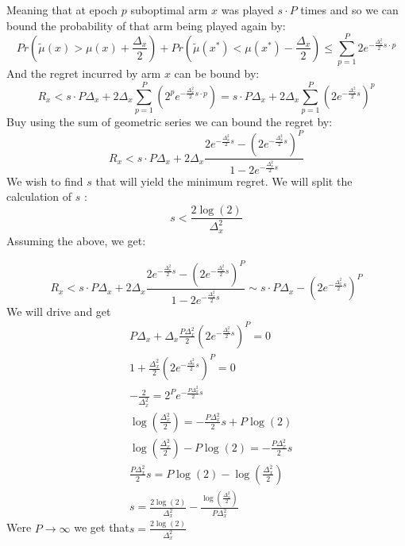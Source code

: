 \documentclass{llncs}
\begin{document}
	Meaning that at epoch $p$ suboptimal arm $x$ was played $s\cdot P$ times and so we can bound the probability of that arm being played again by:
	\begin{equation}
	Pr(\tilde{\mu}(x) > \mu(x) + \frac{\Delta_x}{2})+ 
	Pr(\tilde{\mu}(x^*)< \mu(x^*) - \frac{\Delta_x}{2}) \leq \sum\limits_{p=1}^P 2 e^{-\frac{\Delta^2_x}{2}s\cdot p}
	\end{equation}
	And the regret incurred by arm $x$ can be bound by:
	\begin{equation}
	R_x < s\cdot P\Delta_x+2\Delta_x\sum\limits_{p=1}^P \left( 2^p e^{-\frac{\Delta^2_x}{2}s\cdot p} \right) = s\cdot P\Delta_x+2\Delta_x\sum\limits_{p=1}^P \left( 2 e^{-\frac{\Delta^2_x}{2}s} \right)^p
	\end{equation}
	Buy using the sum of geometric series we can bound the regret by:
	\begin{equation}
	R_x < s\cdot P\Delta_x+2\Delta_x \frac{2 e^{-\frac{\Delta^2_x}{2}s} - (2 e^{-\frac{\Delta^2_x}{2}s})^P}{1-2 e^{-\frac{\Delta^2_x}{2}s}}
	\end{equation}
	We wish to find $s$ that will yield the minimum regret.
	We will split the calculation of $s$ :	
	$$s < \frac{2\log(2)}{\Delta^2_x}$$
	Assuming the above, we get:
	
	\begin{equation}
		R_x < s\cdot P\Delta_x+2\Delta_x \frac{2 e^{-\frac{\Delta^2_x}{2}s} - (2 e^{-\frac{\Delta^2_x}{2}s})^P}{1-2 e^{-\frac{\Delta^2_x}{2}s}} \sim s\cdot P\Delta_x - (2 e^{-\frac{\Delta^2_x}{2}s})^P
	\end{equation}	
	We will drive and get
	\begin{align*}
	& P\Delta_x + \Delta_x\frac{P\Delta^2_x}{2}(2 e^{-\frac{\Delta^2_x}{2}s})^P = 0
	\\
	& 1 +\frac{\Delta^2_x}{2}(2 e^{-\frac{\Delta^2_x}{2}s})^P = 0
	\\
	& -\frac{2}{\Delta^2_x} = 2^P e^{-\frac{P\Delta^2_x}{2}s}
	\\
	& \log(\frac{\Delta^2_x}{2}) = -\frac{P\Delta^2_x}{2}s + P\log(2)
	\\
	& \log(\frac{\Delta^2_x}{2}) - P\log(2) = -\frac{P\Delta^2_x}{2}s
	\\
	& \frac{P\Delta^2_x}{2}s = P\log(2) - \log(\frac{\Delta^2_x}{2})
	\\
	& s = \frac{2\log(2)}{\Delta^2_x} - \frac{\log(\frac{\Delta^2_x}{2})}{P\Delta^2_x}
	\end{align*}
	Were $P\rightarrow \infty$ we get that$s = \frac{2\log(2)}{\Delta^2_x}$
	
\end{document}
